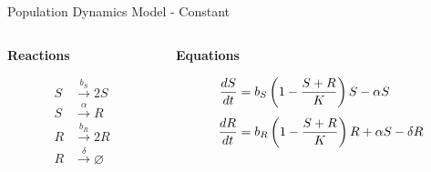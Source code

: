 \documentclass[11pt]{beamer}              %
\begin{document}
\begin{frame}{Population Dynamics Model - Constant}
\begin{columns}
  \begin{column}{.3\paperwidth}

    \centerline{\textbf{Reactions}}
    \begin{minipage}[c][.52\textheight][c]{\linewidth}

      \begin{align*}
        S & \stackrel{b_S}{\rightarrow} 2S \\
        S & \stackrel{\alpha}{\rightarrow}  R \\
        R & \stackrel{b_R}{\rightarrow} 2R \\
        R & \stackrel{\delta}{\rightarrow} \varnothing
      \end{align*}
    \end{minipage}

  \end{column} \vrule
  \pause
  \begin{column}{.6\paperwidth}
    \centerline{\textbf{Equations}}
    \begin{minipage}[c][.52\textheight][c]{\linewidth}
  \begin{align*}
    \frac{dS}{dt} & = b_S \left(1 - \frac{S + R}{K}\right)S - \alpha
      \color{black} S \\[0.8ex]
%
    \frac{dR}{dt} & = b_R \left(1 - \frac{S + R}{K}\right)R + \alpha
    \color{black} S - \delta R \\[0.8ex]
%
  \end{align*}
\end{minipage}
\end{column}
\end{columns}
\end{frame}
\end{document}
